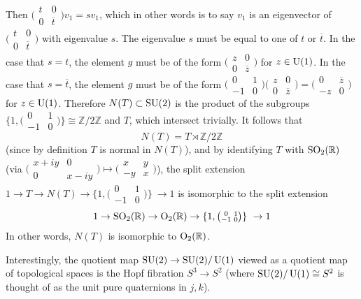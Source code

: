 \documentclass[../../rtnotes.tex]{subfiles}
\begin{document}
Then $\bigl(\!\begin{smallmatrix}
    t & 0 \\ 0 & \overline t
\end{smallmatrix}\!\bigr)v_1 = sv_1$, which in other words is to say $v_1$ is an eigenvector of $\bigl(\!\begin{smallmatrix}
    t & 0 \\ 0 & \overline t
\end{smallmatrix}\!\bigr)$ with eigenvalue $s$. The eigenvalue $s$ must be equal to one of $t$ or $\overline t$. In the case that $s = t$, the element $g$ must be of the form $\bigl(\!\begin{smallmatrix}
    z & 0 \\ 0 & \overline z
\end{smallmatrix}\!\bigr)$ for $z\in \operatorname{U}(1)$. In the case that $s = \overline t$, the element $g$ must be of the form $\bigl(\!\begin{smallmatrix}
    0 & 1 \\ -1 & 0
\end{smallmatrix}\!\bigr)\bigl(\!\begin{smallmatrix}
    z & 0 \\ 0 & \overline z
\end{smallmatrix}\!\bigr) = \bigl(\!\begin{smallmatrix}
    0 & \overline z \\ -z & 0
\end{smallmatrix}\!\bigr)$ for $z\in \operatorname{U}(1)$. Therefore $N(T)\subset \operatorname{SU}(2)$ is the product of the subgroups $\{1,\bigl(\!\begin{smallmatrix}
    0 & 1 \\ -1 & 0
\end{smallmatrix}\!\bigr)\}\cong \mathbb Z/2\mathbb Z$ and $T$, which intersect trivially. It follows that 
\[N(T) = T\rtimes \mathbb Z/2\mathbb Z\]
(since by definition $T$ is normal in $N(T)$), and by identifying $T$ with $\operatorname{SO}_2(\mathbb R)$ (via $\bigl(\!\begin{smallmatrix}
    x+iy & 0 \\ 0 & x-iy
\end{smallmatrix}\!\bigr)\mapsto \bigl(\!\begin{smallmatrix}
    x & y \\ -y & x
\end{smallmatrix}\!\bigr)$), the split extension $1\to T \to N(T) \to \{1,\bigl(\!\begin{smallmatrix}
    0 & 1 \\ -1 & 0
\end{smallmatrix}\!\bigr)\}\ \to 1$ is isomorphic to the split extension
\[1\to \operatorname{SO}_2(\mathbb R) \to \operatorname{O}_2(\mathbb R) \to \{1,\bigl(\!\begin{smallmatrix}
    0 & 1 \\ -1 & 0
\end{smallmatrix}\!\bigr)\}\ \to 1\]
In other words, $N(T)$ is isomorphic to $\operatorname{O}_2(\mathbb R)$.

Interestingly, the quotient map $\operatorname{SU}(2)\to \operatorname{SU}(2)/\operatorname{U}(1)$ viewed as a quotient map of topological spaces is the Hopf fibration $S^3\to S^2$ (where $\operatorname{SU}(2)/\operatorname{U}(1)\cong S^2$ is thought of as the unit pure quaternions in $j,k$). 
\end{document}
